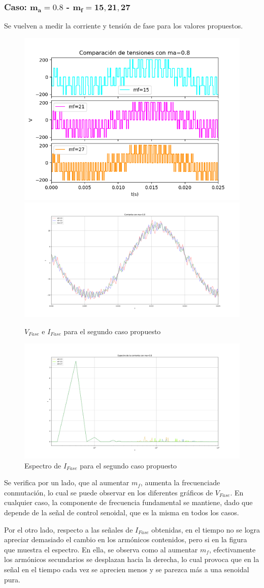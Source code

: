 \documentclass[e4_tp3_main.tex]{subfiles}
\begin{document}
\subsubsection{Caso: $\mathbf{m_a = 0.8}$ - $\mathbf{m_f = 15,21,27}$}
Se vuelven a medir la corriente y tensión de fase para los valores propuestos.
\begin{figure}[H]
\centering
\includegraphics[width=0.49\linewidth]{Imagenes/Ej2c_V.png}
\includegraphics[width=0.49\linewidth]{Imagenes/Ej2c_I.png}
\caption{$V_{Fase}$ e $I_{Fase}$ para el segundo caso propuesto}
\end{figure}
\begin{figure}[H]
\centering
\includegraphics[width=0.9\linewidth]{Imagenes/Ej2cfft.png}
\caption{Espectro de $I_{Fase}$ para el segundo caso propuesto}
\end{figure}
Se verifica por un lado, que al aumentar $m_f$, aumenta la frecuenciade conmutación, lo cual se puede observar en los diferentes gráficos de $V_{Fase}$. En cualquier caso, la componente de frecuencia fundamental se mantiene, dado que depende de la señal de control senoidal, que es la misma en todos los casos.\par
Por el otro lado, respecto a las señales de $I_{Fase}$ obtenidas, en el tiempo no se logra apreciar demasiado el cambio en los armónicos contenidos, pero si en la figura que muestra el espectro. En ella, se observa como al aumentar $m_f$, efectivamente los armónicos secundarios se desplazan hacia la derecha, lo cual provoca que en la señal en el tiempo cada vez se aprecien menos y se parezca más a una senoidal pura.
\end{document}
